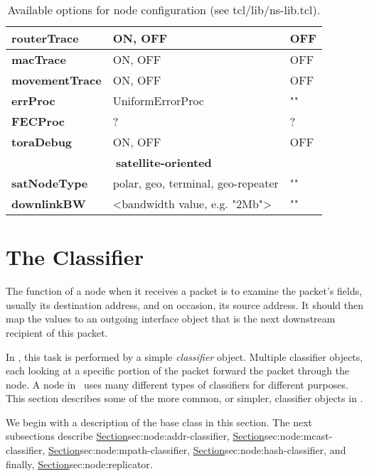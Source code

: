 \begin{table}[h]
\begin{center}
{\begin{tabular}{|l|l|l|}
{\bf routerTrace} & ON, OFF & OFF \\\hline
{\bf macTrace} & ON, OFF & OFF \\\hline
{\bf movementTrace} & ON, OFF & OFF \\\hline
{\bf errProc} & UniformErrorProc & "" \\\hline
{\bf FECProc} &? & ? \\\hline
{\bf toraDebug} & ON, OFF & OFF \\\hline
\multicolumn{3}{|c|}{\bf satellite-oriented} \\\hline
{\bf satNodeType} & polar, geo, terminal, geo-repeater & "" \\\hline
{\bf downlinkBW} & <bandwidth value, e.g. "2Mb"> & ""\\\hline
\end{tabular}
}
\end{center}
\caption{Available options for node configuration (see tcl/lib/ns-lib.tcl).
}
\end{table}
\normalsize

\section{The Classifier}
\label{sec:node:classifiers}

The function of a node when it receives a packet is to examine
the packet's fields, usually its destination address, and
on occasion, its source address.
It should then map the values to an outgoing interface object
that is the next downstream recipient of this packet.

In \ns, this task is performed by a simple \emph{classifier} object.
Multiple classifier objects,
each looking at a specific portion of the packet
forward the packet through the node.
A node in \ns\ uses many different types of classifiers for different purposes.
This section describes some of the more common, or simpler,
classifier objects in \ns.

We begin with a description of the base class in this section.
The next subsections describe
\href{the address classifier}{Section}{sec:node:addr-classifier},
\href{the multicast classifier}{Section}{sec:node:mcast-classifier},
\href{the multipath classifier}{Section}{sec:node:mpath-classifier}, 
\href{the hash classifier}{Section}{sec:node:hash-classifier}, and
finally, \href{the replicator}{Section}{sec:node:replicator}.

